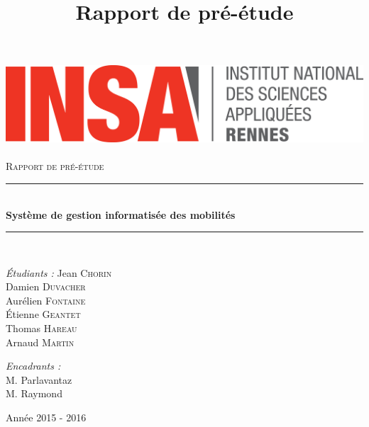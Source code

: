 \documentclass[10pt,a4paper]{article}
\title{Rapport de pré-étude}
\newcommand{\HRule}{\rule{\linewidth}{0.5mm}}
\begin{document}
	
	\begin{titlepage}
		\begin{sffamily}
			\begin{center}
				
				\includegraphics[width=400pt]{logo_INSA.png}~\\[2.5cm]
				
				\textsc{\huge Rapport de pré-étude}\\[2.5cm]
				
				\HRule \\[0.4cm]
				{ \huge \bfseries Système de gestion informatisée des mobilités\\[0.4cm] }
				
				\HRule \\[4cm]
				
				\begin{minipage}{0.4\textwidth}
					\begin{flushleft} \large
						\emph{Étudiants :}
						Jean \textsc{Chorin}\\
						Damien \textsc{Duvacher}\\
						Aurélien \textsc{Fontaine}\\
						Étienne \textsc{Geantet}\\
						Thomas \textsc{Hareau}\\
						Arnaud \textsc{Martin}\\
					\end{flushleft}
				\end{minipage}
				\begin{minipage}{0.5\textwidth}
					\begin{flushright} \large
						\emph{Encadrants :} \\
						M. Parlavantaz\\
						M. Raymond
					\end{flushright}
				\end{minipage}
				
				\vfill
				
				{\large Année 2015 - 2016}
				
			\end{center}
		\end{sffamily}
	\end{titlepage}
	\tableofcontents	
\end{document}
